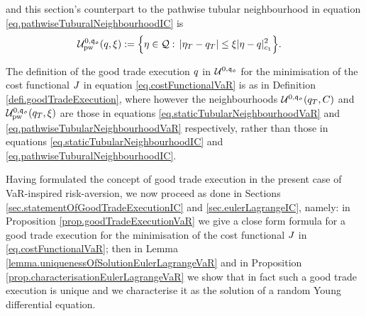 \documentclass[10pt,a4paper]{article}
\begin{document}
and  this section's counterpart to the pathwise tubular neighbourhood in equation \eqref{eq.pathwiseTuburalNeighbourhoodIC} is 
\begin{equation}
\begin{split}\label{eq.pathwiseTubularNeighbourhoodVaR}
\mathcal{U}^{0,\mathfrak{q_0}}_{\text{pw}}(q,\xi):=
\Big\lbrace
\eta \in \mathcal{Q}: \, 
\left\lvert {\eta_T-q_T} \right\rvert 
&\leq \xi\lvert \eta - q\rvert ^{2}_{c_{1}}
\Big\rbrace.
\end{split}
\end{equation}

The definition of the good trade execution $q$ in $\mathcal{U}^{0,\mathfrak{q_0}}$ for the minimisation of the cost functional $J$ in equation \eqref{eq.costFunctionalVaR}  is as in Definition \ref{defi.goodTradeExecution}, where however the neighbourhoods $\mathcal{U}^{0,\mathfrak{q_0}} (q_T, C)$ and $\mathcal{U}^{0,\mathfrak{q_0}}_{\text{pw}}(q_T,\xi)$ are those in equations \eqref{eq.staticTubularNeighbourhoodVaR} and \eqref{eq.pathwiseTubularNeighbourhoodVaR} respectively, rather than those in equations \eqref{eq.staticTubularNeighbourhoodIC} and \eqref{eq.pathwiseTuburalNeighbourhoodIC}.

Having formulated the concept of good trade execution in the present case of VaR-inspired risk-aversion, we now proceed as done in Sections \ref{sec.statementOfGoodTradeExecutionIC} and \ref{sec.eulerLagrangeIC}, namely: in Proposition \ref{prop.goodTradeExecutionVaR} we give a close form formula for a good trade execution for the minimisation of the cost functional $J$ in \eqref{eq.costFunctionalVaR}; then in Lemma \ref{lemma.uniquenessOfSolutionEulerLagrangeVaR} and in Proposition \ref{prop.characterisationEulerLagrangeVaR} we show that in fact such a good trade execution is unique and we characterise it as the solution of a random Young differential equation.	
\end{document}
